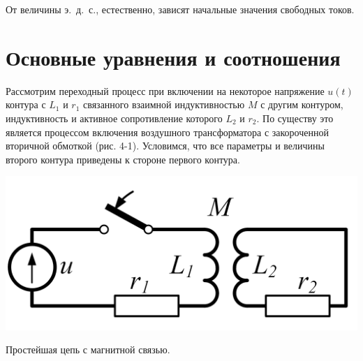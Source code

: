 От величины э.~д.~с., естественно, зависят начальные значения свободных токов.

\section{Основные уравнения и соотношения}
\label{sec:4-2 osnovnye_uravneniia_i_sootnosheniia}

Рассмотрим переходный процесс при включении на некоторое напряжение $ u(t) $ контура с $ L_1 $ и $ r_1 $ связанного взаимной индуктивностью $ M $ с другим контуром, индуктивность и активное сопротивление которого $ L_2 $ и $ r_2 $. По существу это является процессом включения воздушного трансформатора с закороченной вторичной обмоткой (рис. 4-1). Условимся, что все параметры и величины второго контура приведены к стороне первого контура.

\begin{floatingfigure}[lflt]{0.45\linewidth}
	\centering
	\includegraphics[width=0.40\linewidth]{pic/4-1}
	\caption{Простейшая цепь с магнитной связью.}
	\label{ris:4-1 simplest_circut}
\end{floatingfigure}


